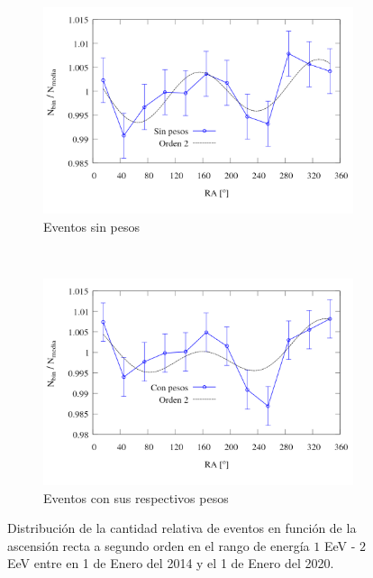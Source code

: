         \begin{figure}[H]
          \centering
            \begin{subfigure}[b]{0.7\textwidth}
		\centering
		\includegraphics[width=\linewidth]{eventos_clasificados_por_RA_v7_orden_2_sin_pesos.png}
		\vspace*{-1.2 cm}
		\caption{Eventos sin pesos}		\label{fig:bin_events_second_order_sin}
            \end{subfigure}\\
            \begin{subfigure}[b]{0.7\textwidth}
		\centering
		\includegraphics[width=\linewidth]{eventos_clasificados_por_RA_v7_orden_2_con_pesos.png}
		\vspace*{-1.2 cm}
		\caption{ Eventos con sus respectivos pesos}		\label{fig:bin_events_second_order_con}
            \end{subfigure}
           \caption{Distribución de la cantidad relativa de eventos en función de la ascensión recta a segundo orden en el rango de energía $1$ EeV - $2$ EeV entre en 1 de Enero del 2014 y el 1 de Enero del 2020.}
         \end{figure}



